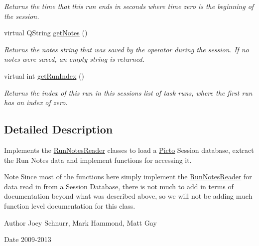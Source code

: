 \begin{DoxyCompactItemize}
\begin{DoxyCompactList}\small\item\em Returns the time that this run ends in seconds where time zero is the beginning of the session. \end{DoxyCompactList}\item 
\hypertarget{class_picto_1_1_run_notes_state_a22ce6cba1558c0c394f9c6113eea497d}{virtual Q\-String \hyperlink{class_picto_1_1_run_notes_state_a22ce6cba1558c0c394f9c6113eea497d}{get\-Notes} ()}\label{class_picto_1_1_run_notes_state_a22ce6cba1558c0c394f9c6113eea497d}

\begin{DoxyCompactList}\small\item\em Returns the notes string that was saved by the operator during the session. If no notes were saved, an empty string is returned. \end{DoxyCompactList}\item 
\hypertarget{class_picto_1_1_run_notes_state_a39ab76599c0eb7e3dfdf655d8f6c4e7e}{virtual int \hyperlink{class_picto_1_1_run_notes_state_a39ab76599c0eb7e3dfdf655d8f6c4e7e}{get\-Run\-Index} ()}\label{class_picto_1_1_run_notes_state_a39ab76599c0eb7e3dfdf655d8f6c4e7e}

\begin{DoxyCompactList}\small\item\em Returns the index of this run in this sessions list of task runs, where the first run has an index of zero. \end{DoxyCompactList}\end{DoxyCompactItemize}


\subsection{Detailed Description}
Implements the \hyperlink{class_picto_1_1_run_notes_reader}{Run\-Notes\-Reader} classes to load a \hyperlink{namespace_picto}{Picto} Session database, extract the Run Notes data and implement functions for accessing it. 

\begin{DoxyNote}{Note}
Since most of the functions here simply implement the \hyperlink{class_picto_1_1_run_notes_reader}{Run\-Notes\-Reader} for data read in from a Session Database, there is not much to add in terms of documentation beyond what was described above, so we will not be adding much function level documentation for this class.
\end{DoxyNote}
\begin{DoxyAuthor}{Author}
Joey Schnurr, Mark Hammond, Matt Gay 
\end{DoxyAuthor}
\begin{DoxyDate}{Date}
2009-\/2013 
\end{DoxyDate}


